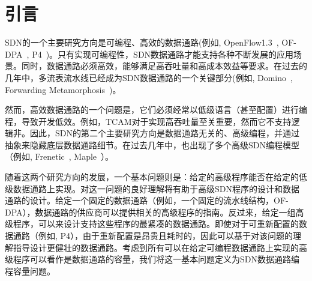 \documentclass{ctexart}
\begin{document}
 



%


\section{引言}\label{sec:introduction}
SDN的一个主要研究方向是可编程、高效的数据通路(例如, OpenFlow1.3~\cite{openflow1-3}, OF-DPA~\cite{OF-DPA}, P4~\cite{P4})。只有实现可编程性，SDN数据通路才能支持各种不断发展的应用场景。同时，数据通路必须高效，能够满足高吞吐量和高成本效益等要求。在过去的几年中，多流表流水线已经成为SDN数据通路的一个关键部分(例如, Domino~\cite{sivaraman2016packet}, Forwarding Metamorphosis~\cite{rmt})。



然而，高效数据通路的一个问题是，它们必须经常以低级语言（甚至配置）进行编程，导致开发低效。例如，TCAM对于实现高吞吐量至关重要，然而它不支持逻辑非。因此，SDN的第二个主要研究方向是数据通路无关的、高级编程，并通过抽象来隐藏底层数据通路细节。在过去几年中，也出现了多个高级SDN编程模型（例如, Frenetic~\cite{foster2011frenetic}, Maple~\cite{maple}）。

随着这两个研究方向的发展，一个基本问题则是：给定的高级程序能否在给定的低级数据通路上实现。对这一问题的良好理解将有助于高级SDN程序的设计和数据通路的设计。给定一个固定的数据通路（例如，一个固定的流水线结构，OF-DPA），数据通路的供应商可以提供相关的高级程序的指南。反过来，给定一组高级程序，可以来设计支持这些程序的最紧凑的数据通路。即使对于可重新配置的数据通路（例如, P4），由于重新配置是昂贵且耗时的，因此可以基于对该问题的理解指导设计更健壮的数据通路。考虑到所有可以在给定可编程数据通路上实现的高级程序可以看作是数据通路的容量，我们将这一基本问题定义为SDN数据通路编程容量问题。
\end{document}
